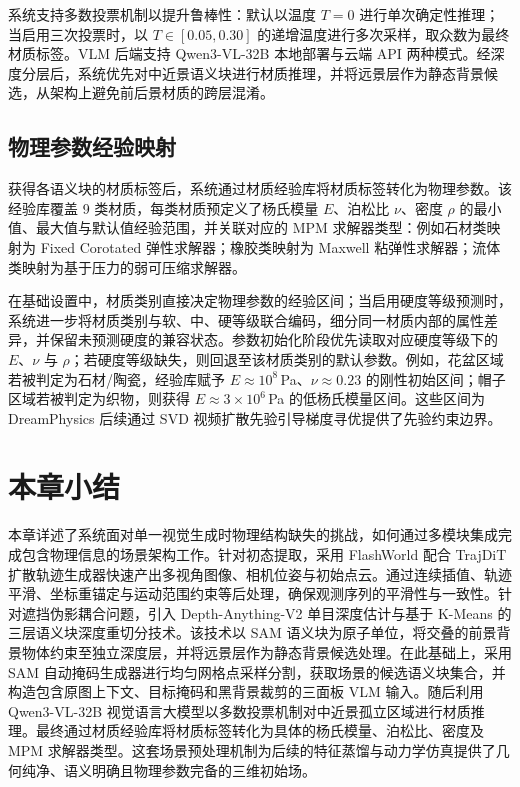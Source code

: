 系统支持多数投票机制以提升鲁棒性：默认以温度 $T=0$ 进行单次确定性推理；当启用三次投票时，以 $T\in[0.05, 0.30]$ 的递增温度进行多次采样，取众数为最终材质标签。VLM 后端支持 Qwen3-VL-32B 本地部署与云端 API 两种模式。经深度分层后，系统优先对中近景语义块进行材质推理，并将远景层作为静态背景候选，从架构上避免前后景材质的跨层混淆。

\subsection{物理参数经验映射}
获得各语义块的材质标签后，系统通过材质经验库将材质标签转化为物理参数。该经验库覆盖 9 类材质，每类材质预定义了杨氏模量 $E$、泊松比 $\nu$、密度 $\rho$ 的最小值、最大值与默认值经验范围，并关联对应的 MPM 求解器类型：例如石材类映射为 Fixed Corotated 弹性求解器；橡胶类映射为 Maxwell 粘弹性求解器；流体类映射为基于压力的弱可压缩求解器。

在基础设置中，材质类别直接决定物理参数的经验区间；当启用硬度等级预测时，系统进一步将材质类别与软、中、硬等级联合编码，细分同一材质内部的属性差异，并保留未预测硬度的兼容状态。参数初始化阶段优先读取对应硬度等级下的 $E$、$\nu$ 与 $\rho$；若硬度等级缺失，则回退至该材质类别的默认参数。例如，花盆区域若被判定为石材/陶瓷，经验库赋予 $E\approx10^8$\,Pa、$\nu\approx0.23$ 的刚性初始区间；帽子区域若被判定为织物，则获得 $E\approx3\times10^6$\,Pa 的低杨氏模量区间。这些区间为 DreamPhysics\cite{dreamphysics} 后续通过 SVD 视频扩散先验引导梯度寻优提供了先验约束边界。

\section{本章小结}
本章详述了系统面对单一视觉生成时物理结构缺失的挑战，如何通过多模块集成完成包含物理信息的场景架构工作。针对初态提取，采用 FlashWorld 配合 TrajDiT 扩散轨迹生成器快速产出多视角图像、相机位姿与初始点云。通过连续插值、轨迹平滑、坐标重锚定与运动范围约束等后处理，确保观测序列的平滑性与一致性。针对遮挡伪影耦合问题，引入 Depth-Anything-V2 单目深度估计与基于 K-Means 的三层语义块深度重切分技术。该技术以 SAM 语义块为原子单位，将交叠的前景背景物体约束至独立深度层，并将远景层作为静态背景候选处理。在此基础上，采用 SAM 自动掩码生成器进行均匀网格点采样分割，获取场景的候选语义块集合，并构造包含原图上下文、目标掩码和黑背景裁剪的三面板 VLM 输入。随后利用 Qwen3-VL-32B 视觉语言大模型以多数投票机制对中近景孤立区域进行材质推理。最终通过材质经验库将材质标签转化为具体的杨氏模量、泊松比、密度及 MPM 求解器类型。这套场景预处理机制为后续的特征蒸馏与动力学仿真提供了几何纯净、语义明确且物理参数完备的三维初始场。
